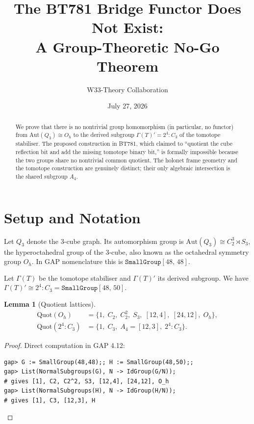 \documentclass[11pt]{amsart}
\title{The BT781 Bridge Functor Does Not Exist: \\
  A Group-Theoretic No-Go Theorem}
\author{W33-Theory Collaboration}
\date{July 27, 2026}
\newtheorem{lemma}[theorem]{Lemma}
\newcommand{\SmallGroup}[2]{\texttt{SmallGroup}[#1,\,#2]}
\begin{document}
\maketitle

\begin{abstract}
We prove that there is no nontrivial group homomorphism (in particular, no functor)
from $\mathrm{Aut}(Q_3) \cong O_h$ to the derived subgroup $\Gamma(T)' = 2^4{:}C_3$ of
the tomotope stabiliser.  The proposed construction in BT781, which claimed to
``quotient the cube reflection bit and add the missing tomotope binary bit,'' is
formally impossible because the two groups share no nontrivial common quotient.
The holonet frame geometry and the tomotope construction are genuinely distinct;
their only algebraic intersection is the shared subgroup $A_4$.
\end{abstract}

\section{Setup and Notation}

Let $Q_3$ denote the 3-cube graph.  Its automorphism group is
$\mathrm{Aut}(Q_3) \cong C_2^3 {\rtimes} S_3$,
the hyperoctahedral group of the 3-cube, also known as the octahedral symmetry
group $O_h$.  In GAP nomenclature this is $\SmallGroup{48}{48}$.

Let $\Gamma(T)$ be the tomotope stabiliser and $\Gamma(T)'$ its derived subgroup.
We have $\Gamma(T)' \cong 2^4{:}C_3 = \SmallGroup{48}{50}$.

\begin{lemma}[Quotient lattices]
\label{lem:quotients}
\begin{align*}
  \mathrm{Quot}(O_h) &= \{1,\; C_2,\; C_2^2,\; S_3,\; [12,4],\; [24,12],\; O_h\},\\
  \mathrm{Quot}(2^4{:}C_3) &= \{1,\; C_3,\; A_4 = [12,3],\; 2^4{:}C_3\}.
\end{align*}
\end{lemma}

\begin{proof}
Direct computation in GAP 4.12:
\begin{verbatim}
gap> G := SmallGroup(48,48);; H := SmallGroup(48,50);;
gap> List(NormalSubgroups(G), N -> IdGroup(G/N));
# gives [1], C2, C2^2, S3, [12,4], [24,12], O_h
gap> List(NormalSubgroups(H), N -> IdGroup(H/N));
# gives [1], C3, [12,3], H
\end{verbatim}
\end{proof}
\end{document}
